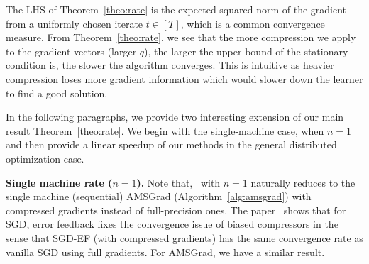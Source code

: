 \documentclass[11pt]{article}
\begin{document}
%

The LHS of Theorem~\ref{theo:rate} is the expected squared norm of the gradient from a uniformly chosen iterate $t\in [T]$, which is a common convergence measure. From Theorem~\ref{theo:rate}, we see that the more compression we apply to the gradient vectors (\ie larger $q$), the larger the upper bound of the stationary condition is, \ie the slower the algorithm converges. This is intuitive as heavier compression loses more gradient information which would slower down the learner to find a good solution.

In the following paragraphs, we provide two interesting extension of our main result Theorem~\ref{theo:rate}. We begin with the single-machine case, when $n=1$ and then provide a linear speedup of our methods in the general distributed optimization case.

\textbf{Single machine rate ($n=1$).} Note that, \algo\ with $n=1$ naturally reduces to the single machine (sequential) AMSGrad (Algorithm~\ref{alg:amsgrad}) with compressed gradients instead of full-precision ones. The paper~\cite{karimireddy2019error} shows that for SGD, error feedback fixes the convergence issue of biased compressors in the sense that SGD-EF (with compressed gradients) has the same convergence rate as vanilla SGD using full gradients. For AMSGrad, we have a similar result.
\end{document}
